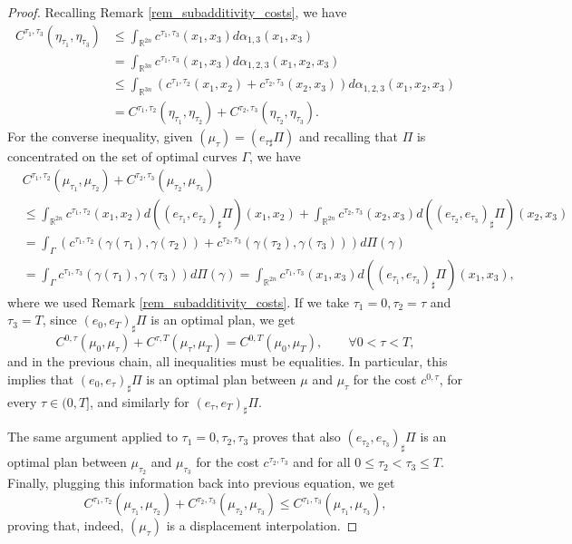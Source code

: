 \documentclass[reqno]{amsart}
\theoremstyle{plain}
\theoremstyle{definition}
\theoremstyle{remark}
\begin{document}
\begin{proof}
			Recalling Remark \ref{rem_subadditivity_costs}, we have
			\begin{align}\label{key_computation_opt_coupling}
				C^{\tau_1,\tau_3}(\eta_{\tau_1},\eta_{\tau_3})&\leq\int_{\mathbb{R}^{2n}}c^{\tau_1,\tau_3}(x_1,x_3)d\alpha_{1,3}(x_1,x_3)\\
				&=\int_{\mathbb{R}^{3n}}c^{\tau_1,\tau_3}(x_1,x_3)d\alpha_{1,2,3}(x_1,x_2,x_3) \nonumber\\
				&\leq\int_{\mathbb{R}^{3n}}\left(c^{\tau_1,\tau_2}(x_1,x_2)+c^{\tau_2,\tau_3}(x_2,x_3)\right)d\alpha_{1,2,3}(x_1,x_2,x_3) \nonumber\\
				&=C^{\tau_1,\tau_2}(\eta_{\tau_1},\eta_{\tau_2})+C^{\tau_2,\tau_3}(\eta_{\tau_2},\eta_{\tau_3}).\nonumber
			\end{align}
		For the converse inequality, given $(\mu_\tau)=(e_{\tau\sharp}\Pi)$ and recalling that $\Pi$ is concentrated on the set of optimal curves $\Gamma$, we have
			\begin{align}
				&	C^{\tau_1,\tau_2}(\mu_{\tau_1},\mu_{\tau_2})+C^{\tau_2,\tau_3}(\mu_{\tau_2},\mu_{\tau_3})\\
				&\leq\int_{\mathbb{R}^{2n}}c^{\tau_1,\tau_2}(x_1,x_2)d\left((e_{\tau_1},e_{\tau_2})_{\sharp}\Pi\right)(x_1,x_2)+\int_{\mathbb{R}^{2n}}c^{\tau_2,\tau_3}(x_2,x_3)d\left((e_{\tau_2},e_{\tau_3})_{\sharp}\Pi\right)(x_2,x_3)\\
				&=\int_{\Gamma}\left(c^{\tau_1,\tau_2}(\gamma(\tau_1),\gamma(\tau_2))+c^{\tau_2,\tau_3}(\gamma(\tau_2),\gamma(\tau_3))\right)d\Pi(\gamma)\\
				&=\int_{\Gamma}c^{\tau_1,\tau_3}(\gamma(\tau_1),\gamma(\tau_3))d\Pi(\gamma)=\int_{\mathbb{R}^{2n}}c^{\tau_1,\tau_3}(x_1,x_3)d\left((e_{\tau_1},e_{\tau_3})_{\sharp}\Pi\right)(x_1,x_3),
			\end{align}
			where we used Remark \ref{rem_subadditivity_costs}.
			If we take $\tau_1=0,\tau_2=\tau$ and $\tau_3=T$, since $(e_0,e_T)_{\sharp}\Pi$ is an optimal plan, we get
			\begin{equation}
				C^{0,\tau}(\mu_0,\mu_\tau)+C^{\tau,T}(\mu_\tau,\mu_T)=C^{0,T}(\mu_0,\mu_T),\qquad\forall 0<\tau<T,
			\end{equation}
			and in the previous chain, all inequalities must be equalities. In particular, this implies that $(e_0,e_\tau)_{\sharp}\Pi$ is an optimal plan between $\mu$ and $\mu_\tau$ for the cost $c^{0,\tau}$, for every $\tau\in(0,T]$, and similarly for $(e_\tau,e_T)_{\sharp}\Pi$.
            
			The same argument applied to $\tau_1=0,\tau_2,\tau_3$ proves that also $(e_{\tau_2},e_{\tau_3})_{\sharp}\Pi$ is an optimal plan between $\mu_{\tau_2}$ and $\mu_{\tau_3}$ for the cost $c^{\tau_2,\tau_3}$ and for all $0\leq \tau_2 <\tau_3\leq T$. Finally, plugging this information back into previous equation, we get 
			\begin{equation}
				C^{\tau_1,\tau_2}(\mu_{\tau_1},\mu_{\tau_2})+C^{\tau_2,\tau_3}(\mu_{\tau_2},\mu_{\tau_3})\leq C^{\tau_1,\tau_3}(\mu_{\tau_1},\mu_{\tau_3}),
			\end{equation}
			proving that, indeed, $(\mu_\tau)$ is a displacement interpolation.
    \end{proof}
	
\end{document}

